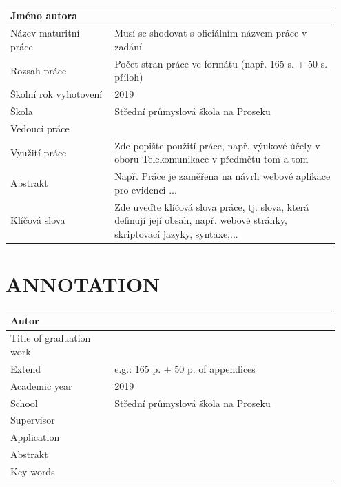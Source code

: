 \documentclass[12pt,a4paper]{article} %
\begin{document}
\begin{table}[htb]

	\begin{tabular}{|p{0.3\linewidth}|p{0.65\linewidth}|} \hline
	Jméno autora          & \\ \hline
	Název maturitní práce & {\color{red} Musí se shodovat s oficiálním názvem práce v zadání}										\\ \hline
	Rozsah práce          & {\color{red} Počet stran práce ve formátu (např. 165 s. + 50 s. příloh)}									\\ \hline
	Školní rok vyhotovení & 2019 \\ \hline
	Škola                 & Střední průmyslová škola na Proseku \\ \hline
	Vedoucí práce         & \\ \hline
	Využití práce         & {\color{red} Zde popište použití práce, např. výukové účely v oboru Telekomunikace v předmětu tom a tom}					\\ \hline
	Abstrakt              & {\color{red} Např. Práce je zaměřena na návrh webové aplikace pro evidenci ...} \\ \hline
	Klíčová slova         & {\color{red} Zde uveďte klíčová slova práce, tj. slova, která definují její obsah, např. webové stránky, skriptovací jazyky, syntaxe,...} \\ \hline
	\end{tabular}
\end{table}
\newpage
\section*{ANNOTATION}

\begin{table}[htb]
	\begin{tabular}{|p{0.3\linewidth}|p{0.65\linewidth}|} \hline
	Autor                    &							\\ \hline
	Title of graduation work &							\\ \hline
	Extend                   & {\color{red} e.g.: 165 p. + 50 p. of appendices}	\\ \hline
	Academic year            & 2019							\\ \hline
	School                   & Střední průmyslová škola na Proseku			\\ \hline
	Supervisor               &							\\ \hline
	Application              &							\\ \hline
	Abstrakt                 &							\\ \hline
	Key words                &                          \\ \hline 
	\end{tabular}
\end{table}
\end{document}
